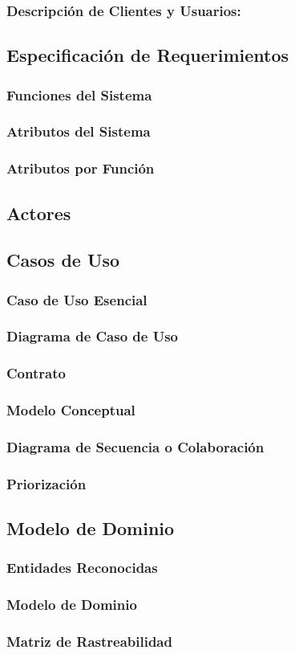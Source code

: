 \subsubsection{Descripción de Clientes y Usuarios:}

\subsection{Especificación de Requerimientos}
\subsubsection{Funciones del Sistema}
\subsubsection{Atributos del Sistema}
\subsubsection{Atributos por Función}

\newpage
\subsection{Actores}

\subsection{Casos de Uso}
\subsubsection{Caso de Uso Esencial}
\subsubsection{Diagrama de Caso de Uso}
\subsubsection{Contrato}
\subsubsection{Modelo Conceptual}
\subsubsection{Diagrama de Secuencia o Colaboración}
\subsubsection{Priorización}

\subsection{Modelo de Dominio}
\subsubsection{Entidades Reconocidas}
\subsubsection{Modelo de Dominio}
\subsubsection{Matriz de Rastreabilidad}